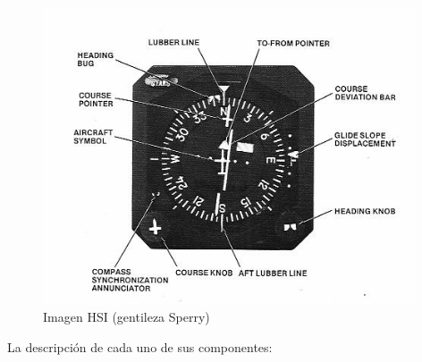 \begin{figure}[!h]
  \centering
  \includegraphics[width=0.98\textwidth]{07.directores.y.ctrol.automatico.vuelo/imagenes/hsi.png}  
  \caption{Imagen HSI (gentileza Sperry)}
  \label{fig:07.hsi.sperry}
\end{figure}


La descripci\'on de cada uno de sus componentes:

